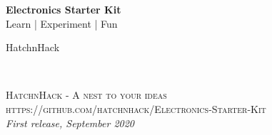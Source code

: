 
\begingroup
\thispagestyle{empty}
\centering
\vspace*{5cm}
\par\normalfont\fontsize{35}{35}\sffamily\selectfont
\textbf{Electronics Starter Kit}\\
{\LARGE Learn | Experiment | Fun}\par %
\vspace*{1cm}
{\Huge HatchnHack}\par %
\endgroup


\newpage
~\vfill
\thispagestyle{empty}


\noindent \textsc{HatchnHack - A nest to your ideas}\\

\noindent \textsc{https://github.com/hatchnhack/Electronics-Starter-Kit}\\ %

\noindent \textit{First release, September 2020} %